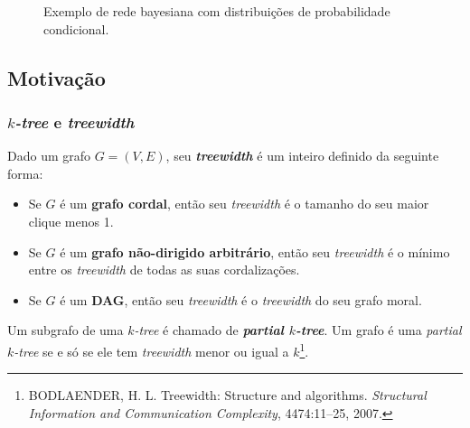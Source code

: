 \documentclass{beamer}
\begin{document}
\begin{frame}
\begin{figure}
{
      }

      \caption{Exemplo de rede bayesiana com distribuições de probabilidade condicional.}
      \label{fig:bayes}
    \end{figure}
  \end{frame}

  \subsection{Motivação}

  \begin{frame}
    \frametitle{\emph{$k$-tree} e \emph{treewidth}}

    Dado um grafo $G = (V, E)$, seu \textbf{\emph{treewidth}} é um inteiro definido da seguinte forma:

    \begin{itemize}
      \item Se $G$ é um \textbf{grafo cordal}, então seu \emph{treewidth} é o tamanho do seu maior clique menos 1.
      \item Se $G$ é um \textbf{grafo não-dirigido arbitrário}, então seu \emph{treewidth} é o mínimo entre os \emph{treewidth} de todas as suas cordalizações.
      \item Se $G$ é um \textbf{DAG}, então seu \emph{treewidth} é o \emph{treewidth} do seu grafo moral.
    \end{itemize}

    Um subgrafo de uma \emph{$k$-tree} é chamado de \textbf{\emph{partial $k$-tree}}. Um grafo é uma \emph{partial $k$-tree} se e só se ele tem \emph{treewidth} menor ou igual a $k$\footnote{\scriptsize BODLAENDER, H. L. Treewidth: Structure and algorithms. \emph{Structural Information and Communication Complexity}, 4474:11--25, 2007.}.
  \end{frame}
\end{document}

